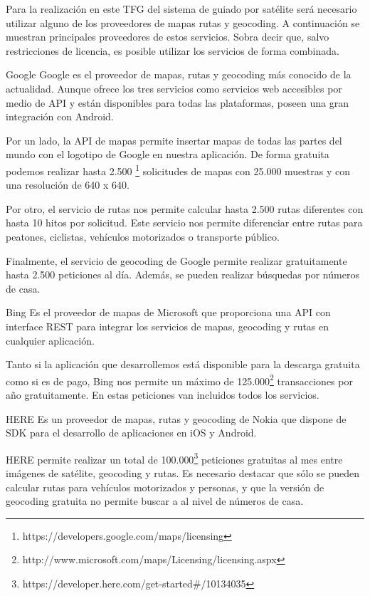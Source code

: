 Para la realización en este \acs{TFG} del sistema de guiado por satélite será necesario utilizar
alguno de los proveedores de mapas rutas y geocoding. A continuación se muestran principales
proveedores de estos servicios. Sobra decir que, salvo restricciones de licencia, es posible
utilizar los servicios de forma combinada.

\begin{definitionlist}
  \item[Google] Google es el proveedor de mapas, rutas y geocoding más conocido de la
    actualidad. Aunque ofrece los tres servicios como servicios web accesibles por medio de
    \acs{API} y están disponibles para todas las plataformas, poseen una gran integración con
    Android.

    Por un lado, la \acs{API} de mapas permite insertar mapas de todas las partes del mundo con el
    logotipo de Google en nuestra aplicación. De forma gratuita podemos realizar hasta
    2.500 \footnote{https://developers.google.com/maps/licensing} solicitudes de mapas con 25.000
    muestras y con una resolución de 640 x 640.

    Por otro, el servicio de rutas nos permite calcular hasta 2.500 rutas diferentes con hasta 10
    hitos por solicitud. Este servicio nos permite diferenciar entre rutas para peatones, ciclistas,
    vehículos motorizados o transporte público.

    Finalmente, el servicio de geocoding de Google permite realizar gratuitamente hasta 2.500
    peticiones al día. Además, se pueden realizar búsquedas por números de casa.

  \item[Bing] Es el proveedor de mapas de Microsoft que proporciona una \acs{API} con interface
    \acf{REST} para integrar los servicios de mapas, geocoding y rutas en cualquier aplicación.

    Tanto si la aplicación que desarrollemos está disponible para la descarga gratuita como si es de
    pago, Bing nos permite un máximo de
    125.000\footnote{http://www.microsoft.com/maps/Licensing/licensing.aspx} transacciones por año
    gratuitamente. En estas peticiones van incluidos todos los servicios.

  \item[HERE] Es un proveedor de mapas, rutas y geocoding de Nokia que dispone de \acf{SDK} para el
    desarrollo de aplicaciones en iOS y Android.

    HERE permite realizar un total de
    100.000\footnote{https://developer.here.com/get-started\#/10134035} peticiones gratuitas al mes
    entre imágenes de satélite, geocoding y rutas. Es necesario destacar que sólo se pueden calcular
    rutas para vehículos motorizados y personas, y que la versión de geocoding gratuita no permite
    buscar a al nivel de números de casa.


\end{definitionlist}
